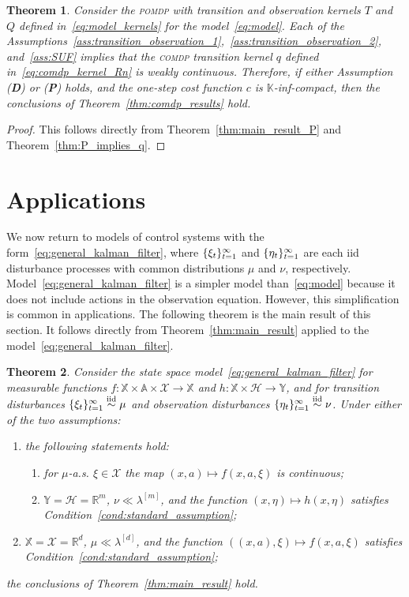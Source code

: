 \documentclass[11pt,onecolumn]{IEEEtran}  %
\newcommand{\Ab}{\mathbb{A}}
\newcommand{\Kb}{\mathbb{K}}
\newcommand{\Rb}{\mathbb{R}}
\newcommand{\Xb}{\mathbb{X}}
\newcommand{\Yb}{\mathbb{Y}}
\newcommand{\Xc}{\mathcal{X}}
\newcommand{\Hc}{\mathcal{H}}
\newcommand{\iid}{\overset{\mathrm{iid}}{\sim}}
\newcommand{\pomdp}{\textsc{pomdp}}
\newcommand{\comdp}{\textsc{comdp}}
\DeclarePairedDelimiter{\set}{\{}{\}}
\newtheorem{theorem}{Theorem}
\theoremstyle{definition}
\begin{document}
\begin{theorem} \label{thm:pomdps_from_equations}
    Consider the \pomdp{} with transition and observation kernels $T$ and $Q$ defined in~\eqref{eq:model_kernels} for the model~\eqref{eq:model}. Each of the Assumptions~\ref{ass:transition_observation_1},~\ref{ass:transition_observation_2}, and~\ref{ass:SUF} implies that the \comdp{} transition kernel $q$ defined in~\eqref{eq:comdp_kernel_Rn} is weakly continuous.  Therefore, if either Assumption (\textbf{D}) or (\textbf{P}) holds, and the one-step cost function $c$ is $\Kb$-inf-compact, then the conclusions of Theorem~\ref{thm:comdp_results} hold.
\end{theorem}

\begin{proof}
    This follows directly from Theorem~\ref{thm:main_result_P} and Theorem~\ref{thm:P_implies_q}.
\end{proof}



\section{Applications} \label{sec:applications}

We now return to models of control systems with the form~\eqref{eq:general_kalman_filter}, where $\set{\xi_t}_{t=1}^{\infty}$ and $\set{\eta_t}_{t=1}^{\infty}$ are each iid disturbance processes with common distributions $\mu$ and $\nu$, respectively. Model~\eqref{eq:general_kalman_filter} is a simpler model than~\eqref{eq:model} because it does not include actions in the observation equation. However, this simplification is common in applications. The following theorem is the main result of this section. It follows directly from Theorem~\ref{thm:main_result} applied to the model~\eqref{eq:general_kalman_filter}.

\begin{theorem} \label{thm:state_space_models}
    Consider the state space model~\eqref{eq:general_kalman_filter} for measurable functions $f : \Xb \times \Ab \times \Xc \to \Xb$ and $h : \Xb \times \Hc \to \Yb$, and for transition disturbances $\set{\xi_t}_{t=1}^{\infty} \iid \mu$ and observation disturbances $\set{\eta_t}_{t=1}^{\infty} \iid \nu$. Under either of the two assumptions:
    \begin{enumerate}
        \item the following statements hold:
        \begin{enumerate}
            \item for $\mu$-a.s. $\xi \in \Xc$ the map $(x,a) \mapsto f(x,a,\xi)$ is continuous;
        \item $\Yb = \Hc = \Rb^m$, $\nu \ll \lambda^{[m]}$, and the function $(x,\eta) \mapsto h(x, \eta)$ satisfies Condition~\ref{cond:standard_assumption};
        \end{enumerate}
        \item $\Xb = \Xc = \Rb^d$, $\mu \ll \lambda^{[d]}$, and the function $((x,a),\xi) \mapsto f(x,a,\xi)$ satisfies Condition~\ref{cond:standard_assumption};
    \end{enumerate}
    the conclusions of Theorem~\ref{thm:main_result} hold.
\end{theorem}
\end{document}

